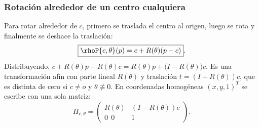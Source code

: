\subsubsection{Rotación alrededor de un centro cualquiera}

Para rotar alrededor de \(c\), primero se traslada el centro al origen, luego se rota y
finalmente se deshace la traslación:
\[
  \boxed{\rhoP{c,\theta}(p)=c+R(\theta)(p-c)}.
\]
Distribuyendo, \(c+R(\theta)p-R(\theta)c=R(\theta)p+\bigl(I-R(\theta)\bigr)c\). Es una
transformación afín con parte lineal \(R(\theta)\) y traslación \(t=(I-R(\theta))c\), que es
distinta de cero si \(c\neq o\) y \(\theta\not\equiv0\). En coordenadas homogéneas
\((x,y,1)^T\) se escribe con una sola matriz:
\[
H_{c,\theta}=
\begin{pmatrix}
R(\theta) & (I-R(\theta))c\\
0\ \ 0 & 1
\end{pmatrix}.
\]

\begin{center}
\end{center}

